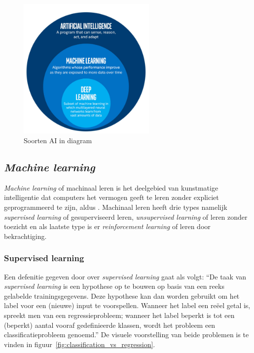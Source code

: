 \begin{figure}
    \centering
    \includegraphics[width=0.6\textwidth]{./img/ai_fields}
    \caption{\label{fig:soorten_ai_diagram} Soorten AI in diagram~\autocite{Bansal2019}}
\end{figure}

\subsection{\textit{Machine learning}}
\textit{Machine learning} of machinaal leren is het deelgebied van kunstmatige intelligentie dat computers het vermogen geeft te leren zonder expliciet geprogrammeerd te zijn, aldus \textcite{Lievens2021}. Machinaal leren heeft drie types namelijk \textit{supervised learning} of gesuperviseerd leren, \textit{unsupervised learning} of leren zonder toezicht en als laatste type is er \textit{reinforcement learning} of leren door bekrachtiging.

\subsubsection{Supervised learning}
Een defenitie gegeven door \textcite{Lievens2021} over \textit{supervised learning} gaat als volgt: ``De taak van \textit{supervised learning} is een hypothese op te bouwen op basis van een reeks gelabelde trainingsgegevens. Deze hypothese kan dan worden gebruikt om het label voor een (nieuwe) input te voorspellen. Wanneer het label een reëel getal is, spreekt men van een regressieprobleem; wanneer het label beperkt is tot een (beperkt) aantal vooraf gedefinieerde klassen, wordt het probleem een classificatieprobleem genoemd.''
De visuele voorstelling van beide problemen is te vinden in figuur~\ref{fig:classification_vs_regression}.


